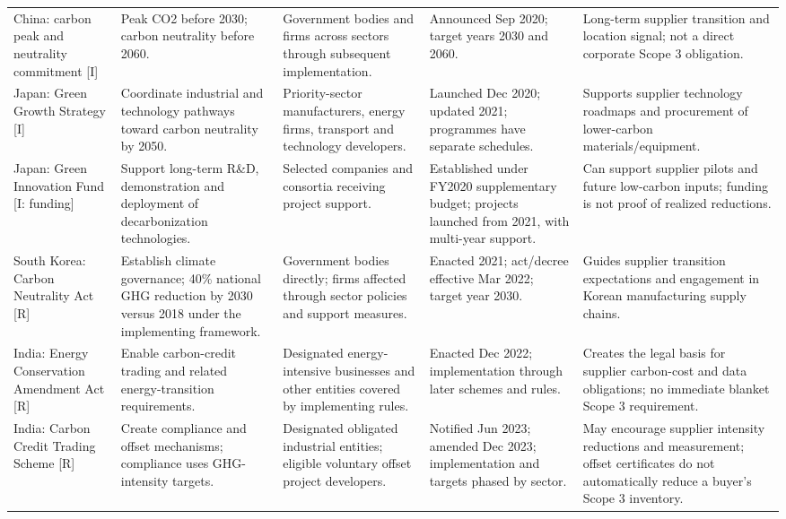 \documentclass[10pt,a4paper,landscape]{article}
\begin{document}
\begin{tabularx}{\textwidth}{Y{0.85}Y{1.00}Y{0.85}Y{1.05}Y{1.25}}
\addlinespace[5pt]
China: carbon peak and neutrality commitment [I]\cite{chinapledge} & Peak CO2 before 2030; carbon neutrality before 2060. & Government bodies and firms across sectors through subsequent implementation. & Announced Sep 2020; target years 2030 and 2060. & Long-term supplier transition and location signal; not a direct corporate Scope 3 obligation. \\
\addlinespace[5pt]
Japan: Green Growth Strategy [I]\cite{japangrowth} & Coordinate industrial and technology pathways toward carbon neutrality by 2050. & Priority-sector manufacturers, energy firms, transport and technology developers. & Launched Dec 2020; updated 2021; programmes have separate schedules. & Supports supplier technology roadmaps and procurement of lower-carbon materials/equipment. \\
\addlinespace[5pt]
Japan: Green Innovation Fund [I: funding]\cite{japanfund} & Support long-term R\&D, demonstration and deployment of decarbonization technologies. & Selected companies and consortia receiving project support. & Established under FY2020 supplementary budget; projects launched from 2021, with multi-year support. & Can support supplier pilots and future low-carbon inputs; funding is not proof of realized reductions. \\
\addlinespace[5pt]
South Korea: Carbon Neutrality Act [R]\cite{korea,koreatarget} & Establish climate governance; 40\% national GHG reduction by 2030 versus 2018 under the implementing framework. & Government bodies directly; firms affected through sector policies and support measures. & Enacted 2021; act/decree effective Mar 2022; target year 2030. & Guides supplier transition expectations and engagement in Korean manufacturing supply chains. \\
\addlinespace[5pt]
India: Energy Conservation Amendment Act [R]\cite{indiaccts} & Enable carbon-credit trading and related energy-transition requirements. & Designated energy-intensive businesses and other entities covered by implementing rules. & Enacted Dec 2022; implementation through later schemes and rules. & Creates the legal basis for supplier carbon-cost and data obligations; no immediate blanket Scope 3 requirement. \\
\addlinespace[5pt]
India: Carbon Credit Trading Scheme [R]\cite{indiaccts} & Create compliance and offset mechanisms; compliance uses GHG-intensity targets. & Designated obligated industrial entities; eligible voluntary offset project developers. & Notified Jun 2023; amended Dec 2023; implementation and targets phased by sector. & May encourage supplier intensity reductions and measurement; offset certificates do not automatically reduce a buyer's Scope 3 inventory. \\

\end{tabularx}
\end{document}
